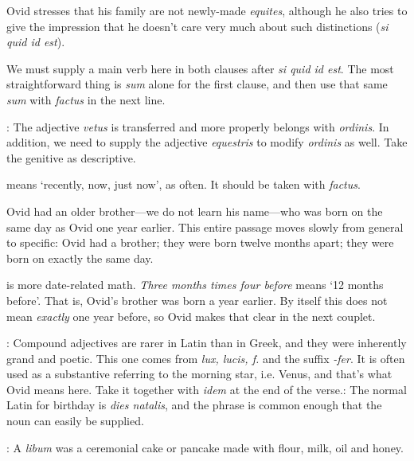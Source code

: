 Ovid stresses that his family are not newly-made \textit{equites}, although he
also tries to give the impression that he doesn't care very much about such
distinctions (\textit{si quid id est}).

We must supply a main verb here in both clauses after \textit{si quid id est}.
The most straightforward thing is \textit{sum} alone for the first clause, and
then use that same \textit{sum} with \textit{factus} in the next line.


: The adjective \textit{vetus} is transferred and more
properly belongs with \textit{ordinis}.  In addition, we need to supply the
adjective \textit{equestris} to modify \textit{ordinis} as well.  Take the
genitive as descriptive.


 means `recently, now, just now', as often. It should be taken with
\textit{factus}.


Ovid had an older brother---we do not learn his name---who was born on the same
day as Ovid one year earlier.  This entire passage moves slowly from general to
specific: Ovid had a brother; they were born twelve months apart; they were
born on exactly the same day.


 is more date-related math.  \textit{Three
months times four before} means `12 months before'.  That is, Ovid's brother
was born a year earlier.  By itself this does not mean \textit{exactly} one
year before, so Ovid makes that clear in the next couplet.


: Compound adjectives are rarer in Latin than in Greek, and they
were inherently grand and poetic.  This one comes from \textit{lux, lucis, f.}
and the suffix \textit{-fer}.  It is often used as a substantive referring to
the morning star, i.e. Venus, and that's what Ovid means here.  Take it
together with \textit{idem} at the end of the verse.\indent{}: The
normal Latin for birthday is \textit{dies natalis}, and the phrase is common
enough that the noun can easily be supplied.


: A \textit{libum} was a ceremonial cake or pancake made with flour,
milk, oil and honey.

